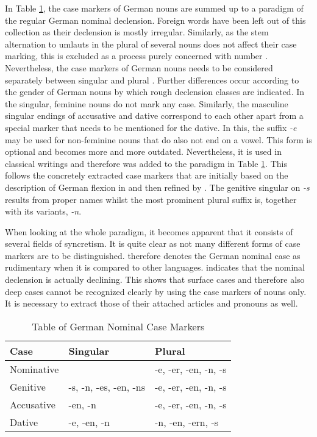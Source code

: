 \documentclass[11pt,a4paper,twoside,openright]{scrbook}
\begin{document}
In Table \ref{table:german_nouns}, the case markers of German nouns are summed up to a paradigm of the regular German nominal declension. Foreign words have been left out of this collection as their declension is mostly irregular. Similarly, as the stem alternation to umlauts in the plural of several nouns does not affect their case marking, this is excluded as a process purely concerned with number \citep{sahel2018ger}. Nevertheless, the case markers of German nouns needs to be considered separately between singular and plural \citep{thieroff2012ger}. Further differences occur according to the gender of German nouns by which rough declension classes are indicated. In the singular, feminine nouns do not mark any case. Similarly, the masculine singular endings of accusative and dative correspond to each other apart from a special marker that needs to be mentioned for the dative. In this, the suffix \textit{-e} may be used for non-feminine nouns that do also not end on a vowel. This form is optional and becomes more and more outdated. Nevertheless, it is used in classical writings and therefore was added to the paradigm in Table \ref{table:german_nouns}. This follows the concretely extracted case markers that are initially based on the description of German flexion in \citep{thieroff2012ger} and then refined by \citep{eisenberg2020ger}. The genitive singular on \textit{-s} results from proper names whilst the most prominent plural suffix is, together with its variants, \textit{-n}.

When looking at the whole paradigm, it becomes apparent that it consists of several fields of syncretism. It is quite clear as not many different forms of case markers are to be distinguished. \citet{sahel2018ger} therefore denotes the German nominal case as rudimentary when it is compared to other languages. \citet{eisenberg2020ger} indicates that the nominal declension is actually declining. This shows that surface cases and therefore also deep cases cannot be recognized clearly by using the case markers of nouns only. It is necessary to extract those of their attached articles and pronouns as well.

\begin{table}[!htbp] 
\centering
\begin{tabular}{|p{}||p{5cm}|p{5cm}|}
 \hline
 Case & Singular & Plural \\ [1ex]
 \hline\hline
 Nominative &  & -e, -er, -en, -n, -s \\ [1ex]
 \hline
 Genitive & -s, -n, -es, -en, -ns & -e, -er, -en, -n, -s \\ [1ex]
 \hline
 Accusative & -en, -n & -e, -er, -en, -n, -s  \\ [1ex]
 \hline
 Dative & -e, -en, -n & -n, -en, -ern, -s  \\ [1ex]
 \hline
\end{tabular}
\caption{Table of German Nominal Case Markers}
\label{table:german_nouns}
\end{table}
\end{document}
